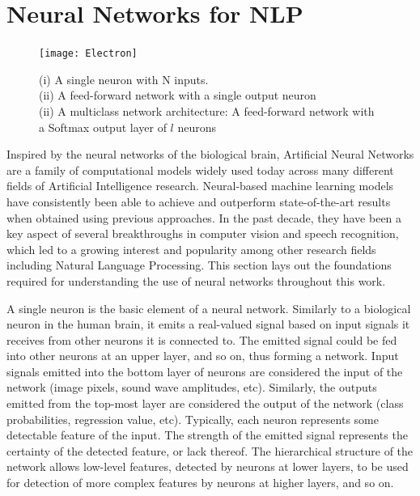 \section{Neural Networks for NLP}

\begin{figure}
  \centering
    \texttt{[image: Electron]}
  \caption{ 
    (i) A single neuron with N inputs. \\
    (ii) A feed-forward network with a single output neuron \\
    (ii) A multiclass network architecture: A feed-forward network with a Softmax output layer of $l$ neurons \\    
  }
  \label{fig:networks}
\end{figure}

Inspired by the neural networks of the biological brain, Artificial Neural Networks are a family of computational models widely used today across many different fields of Artificial Intelligence research. Neural-based machine learning models have consistently been able to achieve and outperform state-of-the-art results when obtained using previous approaches. In the past decade, they have been a key aspect of several breakthroughs in computer vision and speech recognition, which led to a growing interest and popularity among other research fields including Natural Language Processing. This section lays out the foundations required for understanding the use of neural networks throughout this work.

\medskip

A single neuron is the basic element of a neural network. Similarly to a biological neuron in the human brain, it emits a real-valued signal based on input signals it receives from other neurons it is connected to. The emitted signal could be fed into other neurons at an upper layer, and so on, thus forming a network. Input signals emitted into the bottom layer of neurons are considered the input of the network (image pixels, sound wave amplitudes, etc). Similarly, the outputs emitted from the top-most layer are considered the output of the network (class probabilities, regression value, etc). Typically, each neuron represents some detectable feature of the input. The strength of the emitted signal represents the certainty of the detected feature, or lack thereof. The hierarchical structure of the network allows low-level features, detected by neurons at lower layers, to be used for detection of more complex features by neurons at higher layers, and so on.


